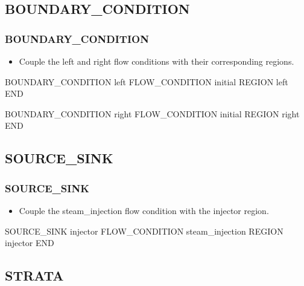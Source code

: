 \documentclass{beamer}
\newcommand\greencomment[1]{{{\color{green} #1}}}
\begin{document}
\subsection{BOUNDARY\_CONDITION}

\begin{frame}[fragile]\frametitle{BOUNDARY\_CONDITION}

\begin{itemize}
\item Couple the \greencomment{left} and \greencomment{right} flow conditions with their corresponding regions.
\end{itemize}

\begin{semiverbatim}

BOUNDARY_CONDITION left
  FLOW_CONDITION initial
  REGION left
END

BOUNDARY_CONDITION right
  FLOW_CONDITION initial
  REGION right
END

\end{semiverbatim}

\end{frame}

\subsection{SOURCE\_SINK}

\begin{frame}[fragile]\frametitle{SOURCE\_SINK}

\begin{itemize}
	\item Couple the \greencomment{steam\_injection} flow condition with the \greencomment{injector} region.
\end{itemize}

\begin{semiverbatim}
SOURCE_SINK injector
  FLOW_CONDITION steam_injection
  REGION injector
END
\end{semiverbatim}

\end{frame}


\subsection{STRATA}
\end{document}

